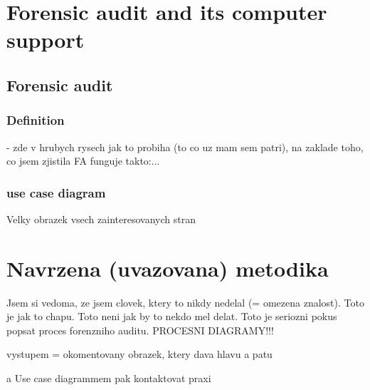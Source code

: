 \setcounter{chapter}{0}
\setcounter{section}{1}
 


\textcolor{gray!55!white}{ \blindtext}
\textcolor{gray!55!white}{ \blindtext}


\chapter*{Forensic audit and its computer support}
\section*{Forensic audit}
\subsection*{Definition}
- zde v hrubych rysech jak to probiha (to co uz mam sem patri), na zaklade toho, co jsem zjistila FA funguje takto:...
\subsection*{use case diagram}
Velky obrazek vsech zainteresovanych stran

\chapter*{Navrzena (uvazovana) metodika}
Jsem si vedoma, ze jsem clovek, ktery to nikdy nedelal (= omezena znalost).
Toto je jak to chapu. Toto neni jak by to nekdo mel delat. Toto je seriozni pokus popsat proces forenzniho auditu.
PROCESNI DIAGRAMY!!!

vystupem = okomentovany obrazek, ktery dava hlavu a patu

a Use case diagrammem pak kontaktovat praxi







